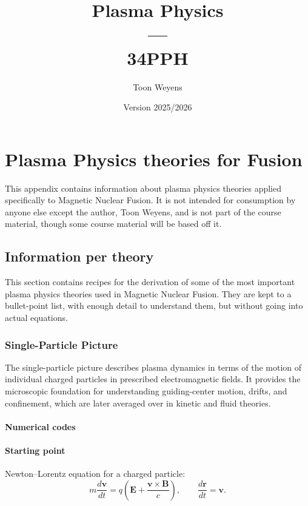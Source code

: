 \documentclass[10pt]{book}
\title{Plasma Physics \\
		--- \\
	34PPH}
\author{Toon Weyens}
\date{Version 2025/2026}
\begin{document}
\maketitle


\chapter{Plasma Physics theories for Fusion}
\label{sec:fusion-plasma-physics}

This appendix contains information about plasma physics theories applied specifically to Magnetic Nuclear Fusion.
It is not intended for consumption by anyone else except the author, Toon Weyens, and is not part of the course material, though some course material will be based off it.

\section{Information per theory}

This section contains recipes for the derivation of some of the most important plasma physics theories used in Magnetic Nuclear Fusion.
They are kept to a bullet-point list, with enough detail to understand them, but without going into actual equations.

\subsection{Single-Particle Picture}
\label{subsec:single-particle}

The single-particle picture describes plasma dynamics in terms of the motion of individual charged particles in prescribed electromagnetic fields. 
It provides the microscopic foundation for understanding guiding-center motion, drifts, and confinement, which are later averaged over in kinetic and fluid theories.

\subsubsection{Numerical codes}

\subsubsection{Starting point}
Newton–Lorentz equation for a charged particle:
\begin{equation}
  m \frac{d\mathbf{v}}{dt} = q \left( \mathbf{E} + \frac{\mathbf{v}\times \mathbf{B}}{c} \right), 
  \qquad
  \frac{d\mathbf{r}}{dt} = \mathbf{v}.
\end{equation}
\end{document}
